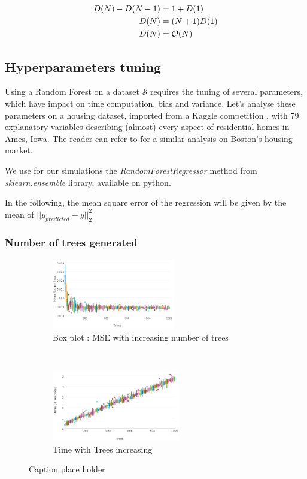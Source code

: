 \documentclass[english,11pt,openany]{article}
\theoremstyle{definition}
\newcommand{\bigO}{\mathcal{O}}
\theoremstyle{plain}
\theoremstyle{definition}
\begin{document}
\begin{appendices}
\begin{itemize}
			\begin{align}
			D(N) - D(N-1) & = 1 + D(1) \notag \\
			D(N) &= (N + 1)D(1) \notag \\
			D(N) & = \bigO(N) \notag 
			\end{align}
			
		\end{itemize}
		
		
		\subsection{Hyperparameters tuning}
		
		Using a Random Forest on a dataset $\mathcal{S}$ requires the tuning of several parameters, which have impact on time computation, bias and variance. 
		Let's analyse these parameters on a housing dataset, imported from a Kaggle competition \cite{kaggle:housing}, with 79 explanatory variables describing (almost) every aspect of residential homes in Ames, Iowa. The reader can refer to \cite{Friedman:2008} for a similar analysis on Boston's housing market. 
		
		We use for our simulations the \textit{RandomForestRegressor} method from \textit{sklearn.ensemble} library, available on python. 
		
		In the following, the mean square error of the regression will be given by the mean of  $||y_{predicted} - y||_2^2$
		
		
		
		\subsubsection{Number of trees generated}
		
		
		\begin{figure}[t!]
			\centering
			\begin{subfigure}[t]{0.5\textwidth}
				\label{figure:mse_trees}
				\includegraphics[height=1.2in]{RF_analysis/mse_trees.png} 
				\caption{Box plot : MSE with increasing number of trees}
			\end{subfigure}%
			~ 
			\begin{subfigure}[t]{0.5\textwidth}
				\label{figure:timing_trees}
				\includegraphics[height=1.2in]{RF_analysis/timing_trees.png} 
				\caption{Time with Trees increasing}
			\end{subfigure}
			\caption{Caption place holder}
		\end{figure}
		

\end{appendices}
\end{document}
